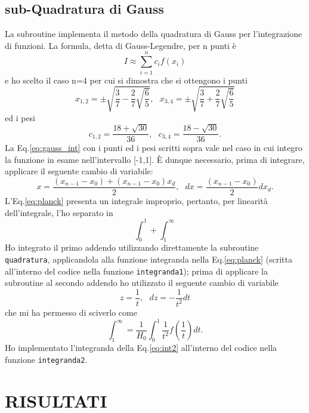 \documentclass{article}
\numberwithin{equation}{subsection}
\begin{document}
\subsection{sub-Quadratura di Gauss}
\vspace{0.2 cm}
La subroutine implementa il metodo della quadratura di Gauss per l'integrazione di funzioni. La formula, detta di Gauss-Legendre, per n punti è
\begin{equation} \label{eq:gauss_int}
    I\approx\sum\limits_{i=1}^{n}c_if(x_i)
\end{equation} 
e ho scelto il caso n=4 per cui si dimostra che si ottengono i punti 
$$x_{1,2}=\pm\sqrt{\frac{3}{7}-\frac{2}{7}\sqrt{\frac{6}{5}}}, \ \ \ x_{3,4}=\pm\sqrt{\frac{3}{7}+\frac{2}{7}\sqrt{\frac{6}{5}}}$$
ed i pesi
$$c_{1,2}=\frac{18+\sqrt{30}}{36}, \ \ \ c_{3,4}=\frac{18-\sqrt{30}}{36}.$$
La Eq.\ref{eq:gauss_int} con i punti ed i pesi scritti sopra vale nel caso in cui integro la funzione in esame nell'intervallo [-1,1]. \`E dunque necessario, prima di integrare, applicare il seguente cambio di variabile:
\begin{equation}
    x=\frac{(x_{n-1}-x_0)+(x_{n-1}-x_0)x_d}{2}, \ \ \ dx=\frac{(x_{n-1}-x_0)}{2}dx_d.
\end{equation}
L'Eq.\ref{eq:planck} presenta un integrale improprio, pertanto, per linearità dell'integrale, l'ho separato in
\begin{equation}
    \int_0^{1}+\int_1^{\infty}
\end{equation}
Ho integrato il primo addendo utilizzando direttamente la subroutine \texttt{quadratura}, applicandola alla funzione integranda nella Eq.\ref{eq:planck} (scritta all'interno del codice nella funzione \texttt{integranda1}); prima di applicare la subroutine al secondo addendo ho utilizzato il seguente cambio di variabile
\begin{equation}
    z=\frac{1}{t}, \ \ \ dz=-\frac{1}{t^2}dt
\end{equation}
che mi ha permesso di sciverlo come
\begin{equation}\label{eq:int2}
    \int_1^{\infty}=\frac{1}{H_0}\int_0^{1}\frac{1}{t^2}f(\frac{1}{t})dt.
\end{equation}
Ho implementato l'integranda della Eq.\ref{eq:int2} all'interno del codice nella funzione \texttt{integranda2}.
\vspace{1 cm}

\section{RISULTATI} \label{sec:risultati}
\vspace{0.1 cm}
\end{document}
